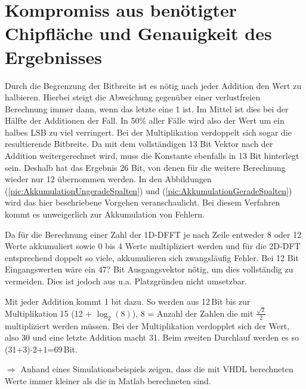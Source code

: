 \section{Kompromiss aus benötigter Chipfläche und Genauigkeit des Ergebnisses}
Durch die Begrenzung der Bitbreite ist es nötig nach jeder Addition den Wert zu halbieren. Hierbei steigt die Abweichung gegenüber einer verlustfreien Berechnung immer dann, 
wenn das letzte eine 1 ist. Im Mittel ist dies bei der Hälfte der Additionen der Fall. In 50$\%$ aller Fälle wird also der Wert um ein halbes LSB zu viel verringert.
Bei der Multiplikation verdoppelt sich sogar die resultierende Bitbreite. Da mit dem vollständigen 13 Bit Vektor nach der Addition weitergerechnet wird, muss die Konstante
ebenfalls in 13 Bit hinterlegt sein. Deshalb hat das Ergebnis 26 Bit, von denen für die weitere Berechnung wieder nur 12 übernommen werden. In den Abbildungen 
(\ref{pic:AkkumulationUngeradeSpalten}) und (\ref{pic:AkkumulationGeradeSpalten}) wird das hier beschriebene Vorgehen veranschaulicht. Bei diesem Verfahren
kommt es unweigerlich zur Akkumulation von Fehlern.
 
Da für die Berechnung einer Zahl der 1D-DFFT je nach Zeile entweder 8 oder 12 Werte akkumuliert sowie 0 bis 4 Werte multipliziert werden und für die 2D-DFT entsprechend doppelt 
so viele, akkumulieren sich zwangsläufig Fehler. Bei 12 Bit Eingangswerten wäre ein 47? Bit Ausgangsvektor nötig, um dies vollständig zu vermeiden. Dies ist jedoch aus u.a.
Platzgründen nicht umsetzbar.

Mit jeder Addition kommt 1 bit dazu. So werden aus 12\,Bit bis zur Multiplikation 15 (12 + $\log_2(8)$), 8 = Anzahl der Zahlen die mit $\tfrac{\sqrt{2}}{2}$ multipliziert
werden müssen. Bei der Multiplikation verdopplet sich der Wert, also 30 und eine letzte Addition macht 31.
Beim zweiten Durchlauf werden es so (31+3)$\cdot$2+1=69\,Bit.

$\Rightarrow$ Anhand eines Simulationsbeispiels zeigen, dass die mit VHDL berechneten Werte immer kleiner als die in Matlab berechneten sind.
